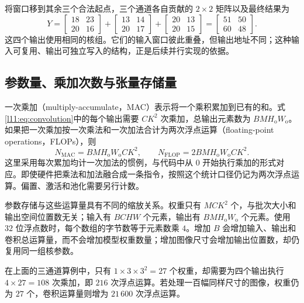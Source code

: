 将窗口移到其余三个合法起点，三个通道各自贡献的 $2\times2$ 矩阵以及最终结果为
\begin{equation}
  Y=
  \begin{bmatrix}18&23\\20&16\end{bmatrix}
  +\begin{bmatrix}13&14\\20&17\end{bmatrix}
  +\begin{bmatrix}20&13\\20&15\end{bmatrix}
  =\begin{bmatrix}51&50\\60&48\end{bmatrix}.
  \label{l11:eq:channel_example_output}
\end{equation}
这四个输出使用相同的核组。它们的输入窗口彼此重叠，但输出地址不同；这种输入可复用、输出可独立写入的结构，正是后续并行实现的依据。

\subsection{参数量、乘加次数与张量存储量}
\label{l11:subsec:work_count}

一次乘加（multiply-accumulate，MAC）表示将一个乘积累加到已有的和。式\eqref{l11:eq:convolution}中的每个输出需要 $CK^2$ 次乘加，总输出元素数为 $BMH_{\mathrm{o}}W_{\mathrm{o}}$。如果把一次乘加按一次乘法和一次加法合计为两次浮点运算（floating-point operations，FLOPs），则
\begin{equation}
  N_{\mathrm{MAC}}=BMH_{\mathrm{o}}W_{\mathrm{o}} CK^2,
  \qquad
  N_{\mathrm{FLOP}}=2BMH_{\mathrm{o}}W_{\mathrm{o}} CK^2.
  \label{l11:eq:flops}
\end{equation}
这里采用每次累加均计一次加法的惯例，与代码中从 $0$ 开始执行乘加的形式对应。即使硬件把乘法和加法融合成一条指令，按照这个统计口径仍记为两次浮点运算。偏置、激活和池化需要另行计数。

参数存储与这些运算量具有不同的缩放关系。权重只有 $MCK^2$ 个，与批次大小和输出空间位置数无关；输入有 $BCHW$ 个元素，输出有 $BMH_{\mathrm{o}}W_{\mathrm{o}}$ 个元素。使用 $32$ 位浮点数时，每个数组的字节数等于元素数乘 $4$。增加 $B$ 会增加输入、输出和卷积总运算量，而不会增加模型权重数量；增加图像尺寸会增加输出位置数，却仍复用同一组核参数。

在上面的三通道算例中，只有 $1\times3\times3^2=27$ 个权重，却需要为四个输出执行 $4\times27=108$ 次乘加，即 $216$ 次浮点运算。若处理一百幅同样尺寸的图像，权重仍为 $27$ 个，卷积运算量则增为 $21\,600$ 次浮点运算。

